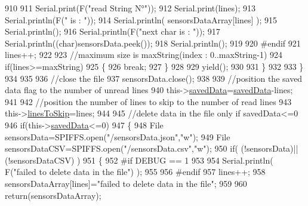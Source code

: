 \begin{DoxyCode}
910      
911                 Serial.print(F(\textcolor{stringliteral}{"read String N°"}));
912                 Serial.print(lines);
913                 Serial.println(F(\textcolor{stringliteral}{" is : "}));
914                 Serial.println( sensorsDataArray[lines] );
915                 Serial.println();
916                 Serial.println(F(\textcolor{stringliteral}{"next char is : "}));
917                 Serial.println((\textcolor{keywordtype}{char})sensorsData.peek());
918                 Serial.println();           
919             
920 \textcolor{preprocessor}{            #endif}
921                 lines++;
922             
923                 \textcolor{comment}{//maximum size is maxString(index : 0..maxString-1)}
924                 \textcolor{keywordflow}{if}(lines>=maxString)
925                 \{
926                     \textcolor{keywordflow}{break};
927                 \}
928             
929                 yield();
930             
931             \}
932 
933         \}
934         
935                     
936         \textcolor{comment}{//close the file}
937         sensorsData.close();
938 
939         \textcolor{comment}{//position the saved data flag to the number of unread lines}
940         this->\hyperlink{class_cool_file_system_ad9f5b739a32100f5f21270c3d9ee2b1d}{savedData}=\hyperlink{class_cool_file_system_ad9f5b739a32100f5f21270c3d9ee2b1d}{savedData}-lines;
941         
942         \textcolor{comment}{//position the number of lines to skip to the number of read lines  }
943         this->\hyperlink{class_cool_file_system_a84fdb6057e534b395512463daa28ea3c}{linesToSkip}=lines;
944 
945         \textcolor{comment}{//delete data in the file only if savedData<=0}
946         \textcolor{keywordflow}{if}(this->\hyperlink{class_cool_file_system_ad9f5b739a32100f5f21270c3d9ee2b1d}{savedData}<=0)
947         \{
948             File sensorsData=SPIFFS.open(\textcolor{stringliteral}{"/sensorsData.json"},\textcolor{stringliteral}{"w"});
949             File sensorsDataCSV=SPIFFS.open(\textcolor{stringliteral}{"/sensorsData.csv"},\textcolor{stringliteral}{"w"});
950             \textcolor{keywordflow}{if}( (!sensorsData)||(!sensorsDataCSV) ) 
951             \{
952 \textcolor{preprocessor}{            #if DEBUG == 1}
953     
954                 Serial.println( F(\textcolor{stringliteral}{"failed to delete data in the file"}) );
955     
956 \textcolor{preprocessor}{            #endif}
957                 lines++;
958                 sensorsDataArray[lines]=\textcolor{stringliteral}{"failed to delete data in the file"};
959 
960                 \textcolor{keywordflow}{return}(sensorsDataArray);

\end{DoxyCode}

